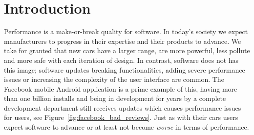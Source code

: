 \chapter{Introduction}
\label{chp:introduction}





% 

Performance is a make-or-break quality for software.
In today's society we expect manufacturers to progress in their expertise and their products to advance.
We take for granted that new cars have a larger range, are more powerful, less pollute and more safe with each iteration of design.
In contrast, software does not has this image; software updates breaking functionalities, adding severe performance issues or increasing the complexity of the user interface are common.
The Facebook mobile Android application is a prime example of this, having more than one billion installs and being in development for years by a complete development department still receives updates which causes performance issues for users, see Figure~\ref{fig:facebook_bad_reviews}.
Just as with their cars users expect software to advance or at least not become \emph{worse} in terms of performance. 

